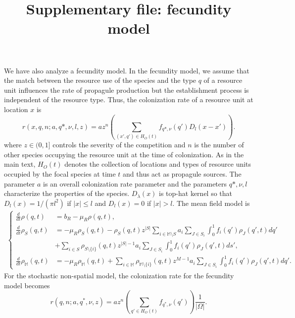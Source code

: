 \documentclass[8pt,a4paper]{article}
\title{Supplementary file: fecundity model}
\author{}
\date{}
\begin{document}
\maketitle
\vspace{-1cm}
We have also analyze a fecundity model.
 In the fecundity model, we assume that the match between the resource use of the species and the type $q$ of a resource unit influences the rate of propagule production but the establishment process is independent of the resource type. 
 Thus, the colonization rate of a resource unit at location $x$ is 
  \begin{equation*}
	r(x,q,n; a, q*,\nu, l, z) = a z^n \left( \sum_{(x' ,q') \in H_O(t)} f_{q*, \nu} (q') D_l(x - x') \right).
\end{equation*}
 where $z \in (0,1]$ controls the severity of the competition and $n$ is the number of other species occupying the resource unit at the time of colonization.
As in the main text, $H_O(t)$ denotes the collection of locations and types of resource units occupied by the focal species  at time $t$ and thus act as propagule sources.
The parameter $a$ is an overall colonization rate parameter and the parameters $q*,\nu , l$ characterize the properties of the species.
$D_{\lambda} (x)$ is top-hat kernel so that $D_l(x) = 1/(\pi l^2)$ if $|x| \leq l$ and $D_l(x) = 0$ if $|x| >  l$. 
The mean field model is
\begin{eqnarray*}
\begin{cases}
\displaystyle{\frac{d}{dt}}\rho(q,t)& = b_R-\mu_R \rho(q,t),\\
\displaystyle{\frac{d}{dt}}\rho_{S}(q,t)& = -\mu_R \rho_S(q,t) -\rho_S(q,t)z^{|S|} \sum_{i \in \mathbb{M} \setminus S} a_i \sum_{J \in S_i} \int_0^1 f_i(q') \rho_J(q',t) dq' \\
 & + \sum_{i \in S} \rho_{S \setminus{\{i\}}}(q,t) z^{|S|-1} a_i \sum_{J \in S_i} \int_0^1 f_i(q') \rho_J(q',t) ds',  \\
\displaystyle{\frac{d}{dt}} \rho_{\mathbb{M}}(q,t) & = - \mu_R \rho_{\mathbb{M}}(q,t) + \sum_{i \in \mathbb{M}} \rho_{\mathbb{M} \setminus{\{i\}}}(q,t) z^{M-1} a_i \sum_{J \in S_i} \int_0^1 f_i(q') \rho_J(q',t) dq'.
\end{cases}
\end{eqnarray*}
%
For the stochastic non-spatial model, the colonization rate for the fecundity model becomes 
\begin{equation*}
r(q, n ; a, q^*, \nu, z) = a z^n \left( \sum_{q' \in H_O(t)} f_{q^*,\nu} (q') \right)\frac{1}{|\Omega|}.
\end{equation*}
\end{document}

